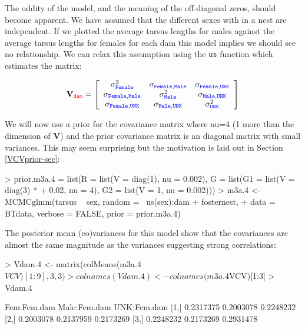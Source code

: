 \documentclass{article}
\begin{document}
The oddity of the model, and the meaning of the off-diagonal zeros, should become apparent. We have assumed that the different sexes with in a nest are independent. If we plotted the average tarsus lengths for males against the average tarsus lengths for females for each dam this model implies we should see no relationship. We can relax this assumption using the \texttt{us} function which estimates the matrix: 

\begin{displaymath}
{\bf V}_{{\color{red} \texttt{dam}}}=
\left[
\begin{array}{ccc}
\sigma^{2}_{\color{blue}\texttt{Female}}&\sigma_{\color{blue}\texttt{Female}, \texttt{Male}}&\sigma_{\color{blue}\texttt{Female}, \texttt{UNK}}\\
\sigma_{\color{blue}\texttt{Female}, \texttt{Male}}&\sigma^{2}_{\color{blue}\texttt{Male}}&\sigma_{\color{blue}\texttt{Male}, \texttt{UNK}}\\
\sigma_{\color{blue}\texttt{Female}, \texttt{UNK}}&\sigma_{\color{blue}\texttt{Male}, \texttt{UNK}}&\sigma^{2}_{\color{blue}\texttt{UNK}}\\
\end{array}
\right]
\end{displaymath}

We will now use a prior for the covariance matrix where nu=4 (1 more than the dimension of {\bf V}) and the prior covariance matrix is an diagonal matrix with small variances. This may seem surprising but the motivation is laid out in Section \ref{VCVprior-sec}: 

\begin{Schunk}
\begin{Sinput}
> prior.m3a.4 = list(R = list(V = diag(1), nu = 0.002), G = list(G1 = list(V = diag(3) * 
+     0.02, nu = 4), G2 = list(V = 1, nu = 0.002)))
> m3a.4 <- MCMCglmm(tarsus ~ sex, random = ~us(sex):dam + fosternest, 
+     data = BTdata, verbose = FALSE, prior = prior.m3a.4)
\end{Sinput}
\end{Schunk}

The posterior mean (co)variances for this model show that the covariances are almost the same magnitude as the variances suggesting strong correlations: 

\begin{Schunk}
\begin{Sinput}
> Vdam.4 <- matrix(colMeans(m3a.4$VCV)[1:9], 3, 3)
> colnames(Vdam.4) <- colnames(m3a.4$VCV)[1:3]
> Vdam.4
\end{Sinput}
\begin{Soutput}
     Fem:Fem.dam Male:Fem.dam UNK:Fem.dam
[1,]   0.2317375    0.2003078   0.2248232
[2,]   0.2003078    0.2137959   0.2173269
[3,]   0.2248232    0.2173269   0.2931478
\end{Soutput}
\end{Schunk}
\end{document}
